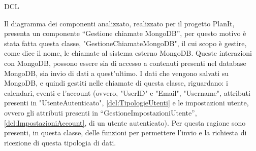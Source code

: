 \begin{listaPersonale}{DCL}
    \begin{center}
        
    \end{center}
    \newpage



    Il diagramma dei componenti analizzato, realizzato per il progetto PlanIt, presenta un componente “Gestione chiamate MongoDB”, per questo motivo è stata fatta questa classe, "GestioneChiamateMongoDB", il cui scopo è gestire, come dice il nome, le chiamate al sistema esterno MongoDB. Queste interazioni con MongoDB, possono essere sia di accesso a contenuti presenti nel database MongoDB, sia invio di dati a quest'ultimo. I dati che vengono salvati su MongoDB, e quindi gestiti nelle chiamate di questa classe, riguardano: i calendari, eventi e l'account (ovvero, "UserID" e "Email", "Username", attributi presenti in "UtenteAutenticato", \ref{dcl:TipologieUtenti} e le impostazioni utente, ovvero gli attributi presenti in “GestioneImpostazioniUtente”, \ref{dcl:ImpostazioniAccount}, di un utente autenticato). Per questa ragione sono presenti, in questa classe, delle funzioni per permettere l'invio e la richiesta di ricezione di questa tipologia di dati.


    \begin{center}
        
    \end{center}



\end{listaPersonale}
